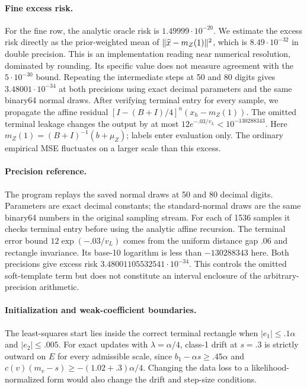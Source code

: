 \paragraph{Fine excess risk.}
For the fine row, the analytic oracle risk is $1.49999\cdot10^{-20}$.
We estimate the excess risk directly as the prior-weighted mean of
$\lVert\widehat x-m_Z(1)\rVert^2$, which is $8.49\cdot10^{-32}$ in double precision. This is an implementation
reading near numerical resolution, dominated by rounding. Its specific
value does not measure agreement with the $5\cdot10^{-30}$ bound.
Repeating the intermediate steps at 50 and 80 digits gives
$3.48001\cdot10^{-34}$ at both precisions using exact decimal parameters
and the same binary64 normal draws. After verifying terminal entry for
every sample, we propagate the affine residual
$[I-(B+I)/4]^n(x_h-m_Z(1))$.
The omitted terminal leakage changes the output by at most
$12e^{-.03/v_L}<10^{-130288343}$.
Here $m_Z(1)=(B+I)^{-1}(b+\mu_Z)$; labels enter evaluation only. The ordinary empirical MSE fluctuates on a
larger scale than this excess.

\paragraph{Precision reference.}
The program  replays
the saved normal draws at 50 and 80 decimal digits. Parameters are
exact decimal constants; the standard-normal draws are the same
binary64 numbers in the original sampling stream. For each of 1536
samples it checks terminal entry before using the analytic affine
recursion. The terminal error bound $12\exp(-.03/v_L)$ comes from
the uniform distance gap $.06$ and rectangle invariance. Its
base-10 logarithm is less than $-130288343$ here. Both precisions
give excess risk $3.48001105532541\cdot10^{-34}$.
This controls the omitted soft-template term but does not constitute
an interval enclosure of the arbitrary-precision arithmetic.

\paragraph{Initialization and weak-coefficient boundaries.}
The least-squares start lies inside the correct terminal rectangle
when $|e_1|\le .1\alpha$ and $|e_2|\le.005$.
For exact updates with $\lambda=\alpha/4$, class-1 drift at $s=.3$
is strictly outward on $E$ for every admissible scale, since
$b_1-\alpha s\ge .45\alpha$ and
$c(v)(m_v-s)\ge-(1.02+.3)\alpha/4$.
Changing the data loss to a likelihood-normalized form would also
change the drift and step-size conditions.

